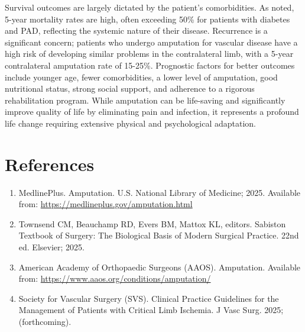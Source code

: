 Survival outcomes are largely dictated by the patient's comorbidities. As noted, 5-year mortality rates are high, often exceeding 50\% for patients with diabetes and PAD, reflecting the systemic nature of their disease. Recurrence is a significant concern; patients who undergo amputation for vascular disease have a high risk of developing similar problems in the contralateral limb, with a 5-year contralateral amputation rate of 15-25\%. Prognostic factors for better outcomes include younger age, fewer comorbidities, a lower level of amputation, good nutritional status, strong social support, and adherence to a rigorous rehabilitation program. While amputation can be life-saving and significantly improve quality of life by eliminating pain and infection, it represents a profound life change requiring extensive physical and psychological adaptation.

\section*{References}
\begin{enumerate}
  \item MedlinePlus. Amputation. U.S. National Library of Medicine; 2025. Available from: \url{https://medlineplus.gov/amputation.html}
  \item Townsend CM, Beauchamp RD, Evers BM, Mattox KL, editors. Sabiston Textbook of Surgery: The Biological Basis of Modern Surgical Practice. 22nd ed. Elsevier; 2025.
  \item American Academy of Orthopaedic Surgeons (AAOS). Amputation. Available from: \url{https://www.aaos.org/conditions/amputation/}
  \item Society for Vascular Surgery (SVS). Clinical Practice Guidelines for the Management of Patients with Critical Limb Ischemia. J Vasc Surg. 2025; (forthcoming).
\end{enumerate}

\clearpage
